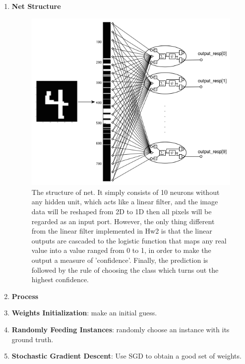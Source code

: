 \documentclass[12pt]{article}
\makeatletter
\renewenvironment{itemize}
{\list{$\bullet$}{\leftmargin\z@ \labelwidth\z@ \itemindent-\leftmargin
\let\makelabel\descriptionlabel}}
{\endlist}
\makeatother
\begin{document}
\begin{enumerate}
	\item {\bf Net Structure}
	\begin{figure}
		\hspace*{-2em}
		\includegraphics[scale=.65]{../res/netStruct.png}
		\caption{The structure of net. It simply consists of 10 neurons without any hidden unit, which acts like a linear filter, and the image data will be reshaped from 2D to 1D then all pixels will be regarded as an input port. However, the only thing different from the linear filter implemented in Hw2 is that the linear outputs are cascaded to the logistic function that maps any real value into a value ranged from 0 to 1, in order to make the output a measure of 'confidence'. Finally, the prediction is followed by the rule of choosing the class which turns out the highest confidence.}
	\end{figure}
	
	\newpage
	\item {\bf Process}
	\begin{itemize}
		\item {\bf Weights Initialization}: make an initial guess.
		\item {\bf Randomly Feeding Instances}: randomly choose an instance with its ground truth.
		\item {\bf Stochastic Gradient Descent}: Use SGD to obtain a good set of weights.
	\end{itemize}
\end{enumerate}
\end{document}
